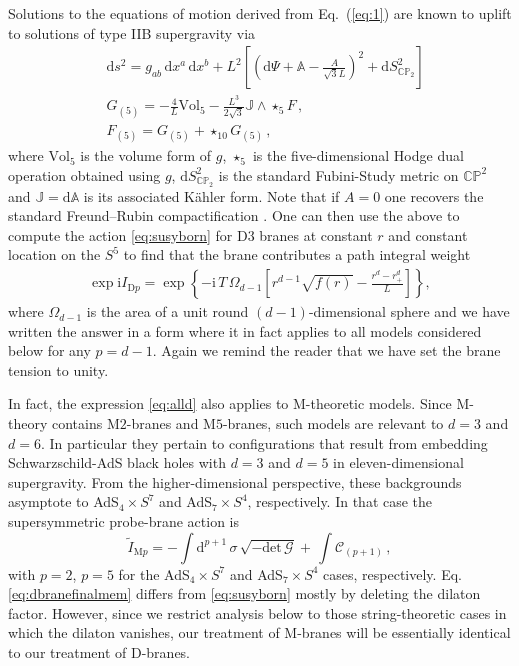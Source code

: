 \documentclass[11pt]{article}
\renewcommand{\i}{\mathrm{i}}
\begin{document}
Solutions to the equations of motion derived from Eq.~(\ref{eq:1}) are known to uplift to solutions of type IIB supergravity via \cite{Chamblin:1999tk,Cvetic:1999xp,Cvetic:2000nc}
\begin{subequations}
\begin{align}
&\mathrm{d}s^2= g_{ab}\,\mathrm{d}x^a\,\mathrm{d}x^b+L^2\left[\left(\mathrm{d}\Psi+\mathbb{A}-\frac{A}{\sqrt{3}L}\right)^2+\mathrm{d}S_{\mathbb{CP}_2}^2\right]
\\
&G_{(5)}=-\frac{4}{L}\mathrm{Vol}_{5}-\frac{L^3}{2\sqrt{3}}\mathbb{J}\wedge \star_5 F\,,
\\
&F_{(5)}=G_{(5)}+\star_{10} G_{(5)}\,,
\end{align}
\label{eq:consi}%
\end{subequations}
where $\mathrm{Vol}_5$ is the volume form of $g$, $\star_5$ is the five-dimensional Hodge dual operation obtained using $g$, $\mathrm{d}S^2_{\mathbb{CP}_2}$ is the standard Fubini-Study metric on $\mathbb{CP}^2$ and $\mathbb{J} = \mathrm{d}\mathbb{A}$ is its associated K\"ahler form. 
Note that if $A=0$ one recovers the standard Freund–Rubin compactification \cite{Freund:1980xh}. 
One can then use the above to compute the action \ref{eq:susyborn} for D3 branes at constant $r$ and constant location on the $S^5$ to find that the brane contributes a path integral weight
\begin{align}
    \exp \i I_{{\mathrm D}p}  = \exp \left\{
    - \i\,T\,\Omega_{d-1}\left[r^{d-1}\sqrt{f(r)} - \frac{r^d - r_+^d}{L}  \right]
    \right\},
    \label{eq:alld}
\end{align}
where $\Omega_{d-1}$ is the area of a unit round $(d-1)$-dimensional sphere and we have written the answer in a form where it in fact applies to all models considered below for any $p=d-1$.
Again we remind the reader that we have set the brane tension to unity.  


In fact, the expression \eqref{eq:alld} also applies to M-theoretic models.
Since M-theory contains M$2$-branes and M$5$-branes, such models are relevant to $d=3$ and $d=6$.  
In particular they pertain to configurations that result from embedding Schwarzschild-AdS black holes with $d=3$ and $d=5$ in eleven-dimensional supergravity. 
From the higher-dimensional perspective, these backgrounds asymptote to AdS$_4\times S^7$ and AdS$_7\times S^4$, respectively. 
In that case the supersymmetric probe-brane action is \begin{equation}
\tilde{I}_{\mathrm{M}p}=-\int \mathrm{d}^{p+1}\,\sigma\,\sqrt{-\mathrm{det}\,\mathcal{G}}+\,\int \mathcal{C}_{(p+1)}\, ,
\label{eq:dbranefinalmem}
\end{equation}
with $p=2$, $p=5$ for the AdS$_4\times S^7$ and AdS$_7\times S^4$ cases, respectively.
Eq. \eqref{eq:dbranefinalmem} differs from \eqref{eq:susyborn} mostly by deleting the dilaton factor. 
However, since we restrict analysis below to those string-theoretic cases in which the dilaton vanishes, our treatment of M-branes will be essentially identical to our treatment of D-branes.
\end{document}
